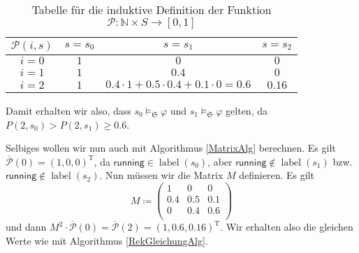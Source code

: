 \begin{table}[h]
	\begin{center}
		\begin{tabular}{c|ccc}
			$\mathcal{P}(i,s)$ & $s=s_0$ & $s=s_1$ & $s=s_2$ \\
			\hline
			$i=0$ & $1$  & $0$ & $0$ \\
			$i=1$ & $1$  & $0.4$ & $0$ \\
			$i=2$ & $1$  & $0.4\cdot 1 + 0.5\cdot 0.4 + 0.1\cdot 0=0.6$ & $0.16$ \\
		\end{tabular}
		\caption{Tabelle für die induktive Definition der Funktion $\mathcal{P}:\mathbb{N}\times S \to [0,1]$}
		\label{RekAlgBsp1}
	\end{center}
\end{table}

Damit erhalten wir also, dass $s_0\models_\mathfrak{S}\varphi$ und $s_1\models_\mathfrak{S}\varphi$ gelten, da $P(2,s_0)>P(2,s_1) \geq 0.6$.

Selbiges wollen wir nun auch mit Algorithmus \ref{MatrixAlg} berechnen.
Es gilt $\overline{\mathcal{P}}(0)=(1,0,0)^{\operatorname{T}}$, da $\mathsf{running}\in\operatorname{label}(s_0)$, aber $\mathsf{running}\notin\operatorname{label}(s_1)$ bzw. $\mathsf{running}\notin\operatorname{label}(s_2)$. 
Nun müssen wir die Matrix $M$ definieren. Es gilt
$$
M\coloneqq \begin{pmatrix}
	1 & 0 & 0 \\
	0.4 & 0.5 & 0.1 \\
	0 & 0.4 & 0.6 \\
\end{pmatrix}
$$
und dann $M^2\cdot \overline{\mathcal{P}}(0) = \overline{\mathcal{P}}(2)= (1,0.6,0.16)^{\operatorname{T}}$. Wir erhalten also die gleichen Werte wie mit Algorithmus \ref{RekGleichungAlg}.

